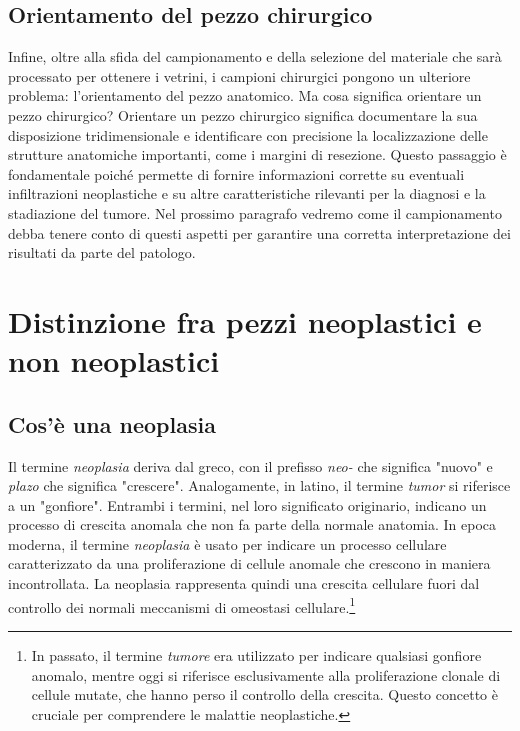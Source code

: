 \subsection{Orientamento del pezzo chirurgico}
Infine, oltre alla sfida del campionamento e della selezione del materiale che sarà processato per ottenere i vetrini, i campioni chirurgici pongono un ulteriore problema: l'orientamento del pezzo anatomico. Ma cosa significa orientare un pezzo chirurgico? Orientare un pezzo chirurgico significa documentare la sua disposizione tridimensionale e identificare con precisione la localizzazione delle strutture anatomiche importanti, come i margini di resezione. Questo passaggio è fondamentale poiché permette di fornire informazioni corrette su eventuali infiltrazioni neoplastiche e su altre caratteristiche rilevanti per la diagnosi e la stadiazione del tumore. Nel prossimo paragrafo vedremo come il campionamento debba tenere conto di questi aspetti per garantire una corretta interpretazione dei risultati da parte del patologo.

\section{Distinzione fra pezzi neoplastici e non neoplastici}

\subsection{Cos'è una neoplasia}
Il termine \textit{neoplasia} deriva dal greco, con il prefisso \textit{neo-} che significa "nuovo" e \textit{plazo} che significa "crescere". Analogamente, in latino, il termine \textit{tumor} si riferisce a un "gonfiore". Entrambi i termini, nel loro significato originario, indicano un processo di crescita anomala che non fa parte della normale anatomia. In epoca moderna, il termine \textit{neoplasia} è usato per indicare un processo cellulare caratterizzato da una proliferazione di cellule anomale che crescono in maniera incontrollata. La neoplasia rappresenta quindi una crescita cellulare fuori dal controllo dei normali meccanismi di omeostasi cellulare.\footnote{In passato, il termine \textit{tumore} era utilizzato per indicare qualsiasi gonfiore anomalo, mentre oggi si riferisce esclusivamente alla proliferazione clonale di cellule mutate, che hanno perso il controllo della crescita. Questo concetto è cruciale per comprendere le malattie neoplastiche.}

